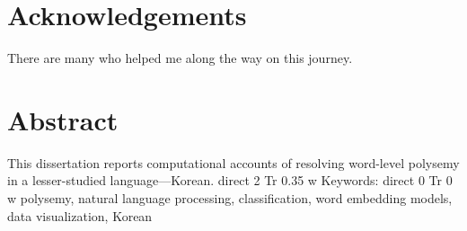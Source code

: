 \documentclass[12pt, twoside]{book} %
\newcommand{\textBF}[1]{%
    \pdfliteral direct {2 Tr 0.35 w} %
     #1%
    \pdfliteral direct {0 Tr 0 w}%
}
\begin{document}
\frontmatter
\pagestyle{empty}


% 






%

\chapter*{Acknowledgements}
\noindent There are many who helped me along the way on this journey. 

\chapter*{Abstract}
\noindent This dissertation reports computational accounts of resolving word-level polysemy in a lesser-studied language—Korean. 
\newline
\indent \textBF{Keywords:} polysemy, natural language processing, classification, word embedding models, data visualization, Korean


\tableofcontents


\listoftables


\listoffigures

\end{document}
